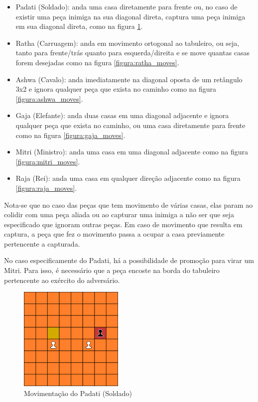 \documentclass{article}
\begin{document}
    \begin{itemize}
        \item Padati (Soldado): anda uma casa diretamente para frente ou, no caso de existir uma peça inimiga na sua diagonal direta, captura uma peça inimiga em sua diagonal direta, como na figura \ref{figura:padati_moves}.
        
        \item Ratha (Carruagem): anda em movimento ortogonal ao tabuleiro, ou seja, tanto para frente/trás quanto para esquerda/direita e se move quantas casas forem desejadas como na figura \ref{figura:ratha_moves}.
        
        \item Ashwa (Cavalo): anda imediatamente na diagonal oposta de um retângulo 3x2 e ignora qualquer peça que exista no caminho como na figura \ref{figura:ashwa_moves}.
        
        \item Gaja (Elefante): anda duas casas em uma diagonal adjacente e ignora qualquer peça que exista no caminho, ou uma casa diretamente para frente como na figura \ref{figura:gaja_moves}.
        
        \item Mitri (Ministro): anda uma casa em uma diagonal adjacente como na figura \ref{figura:mitri_moves}.
        
        \item Raja (Rei): anda uma casa em qualquer direção adjacente como na figura \ref{figura:raja_moves}.
        
    \end{itemize}
    
    Nota-se que no caso das peças que tem movimento de várias casas, elas param ao colidir com uma peça aliada ou ao capturar uma inimiga a não ser que seja especificado que ignoram outras peças. Em caso de movimento que resulta em captura, a peça que fez o movimento passa a ocupar a casa previamente pertencente a capturada.

    No caso especificamente do Padati, há a possibilidade de promoção para virar um Mitri. Para isso, é necessário que a peça encoste na borda do tabuleiro pertencente ao exército do adversário.
    
    \begin{figure}[h]
    \centering
    \includegraphics[width=5cm]{imgs/padati_moves.png}
    \caption{Movimentação do Padati (Soldado)}
    \label{figura:padati_moves}
    \end{figure}
    
\end{document}

